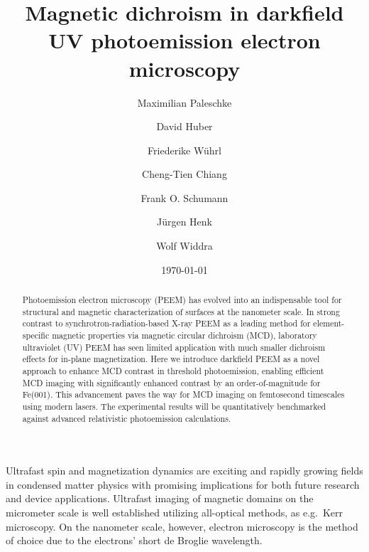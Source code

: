 \documentclass[prl,twocolumn,floatfix,superscriptaddress,aps]{revtex4-2}
\begin{document}
\title{Magnetic dichroism in darkfield UV photoemission electron microscopy}
\author{Maximilian Paleschke}
\author{David Huber}
\author{Friederike W\"{u}hrl}

\author{Cheng-Tien Chiang}

\author{Frank O. Schumann}

\author{J\"{u}rgen Henk}
\author{Wolf Widdra}


\date{\today}

\begin{abstract}
    Photoemission electron microscopy (PEEM) has evolved into an indispensable tool for structural and magnetic characterization of surfaces at the nanometer scale. In strong contrast to synchrotron-radiation-based X-ray PEEM as a leading method for element-specific magnetic properties via magnetic circular dichroism (MCD), laboratory ultraviolet (UV) PEEM has seen limited application with much smaller dichroism effects for in-plane magnetization. Here we introduce darkfield PEEM as a novel approach to enhance MCD contrast in threshold photoemission, enabling efficient MCD imaging with significantly enhanced contrast by an order-of-magnitude for Fe(001). This advancement paves the way for
    MCD imaging on femtosecond timescales using modern lasers. The experimental results will be quantitatively benchmarked against advanced relativistic photoemission calculations.
\end{abstract}

\pacs{}

\maketitle
Ultrafast spin and magnetization dynamics are exciting and rapidly growing fields in condensed matter physics with promising implications for both future research and device applications. Ultrafast imaging of magnetic domains on the micrometer scale is well established utilizing all-optical methods, as e.g.\ Kerr microscopy. On the nanometer scale, however, electron microscopy is the method of choice due to the electrons' short de Broglie wavelength. 
\end{document}
